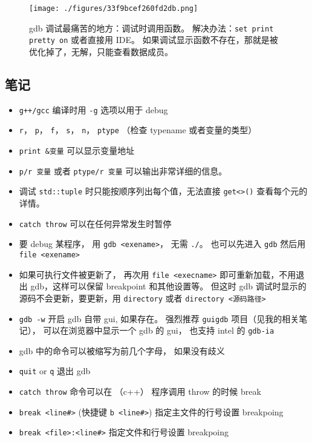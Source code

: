 

\begin{figure}[ht]
\centering
\texttt{[image: ./figures/33f9bcef260fd2db.png]}
\caption{gdb 调试最痛苦的地方：调试时调用函数。 解决办法：\verb`set print pretty on` 或者直接用 IDE。 如果调试显示函数不存在，那就是被优化掉了，无解，只能查看数据成员。} \label{fig_gdbNt_1}
\end{figure}

\subsection{笔记}
\begin{itemize}
\item \verb`g++/gcc` 编译时用 \verb`-g` 选项以用于 debug
\item \verb`r`， \verb`p`， \verb`f`， \verb`s`， \verb`n`， \verb`ptype` （检查 typename 或者变量的类型）
\item \verb`print &变量` 可以显示变量地址
\item \verb`p/r 变量` 或者 \verb`ptype/r 变量` 可以输出非常详细的信息。
\item 调试 \verb`std::tuple` 时只能按顺序列出每个值，无法直接 \verb`get<>()` 查看每个元的详情。
\item \verb`catch throw` 可以在任何异常发生时暂停
\item 要 debug 某程序， 用 \verb`gdb <exename>`， 无需 \verb`./`。 也可以先进入 \verb`gdb` 然后用 \verb`file <exename>`
\item 如果可执行文件被更新了， 再次用 \verb`file <execname>` 即可重新加载，不用退出 gdb，这样可以保留 breakpoint 和其他设置等。 但这时 gdb 调试时显示的源码不会更新，要更新，用 \verb`directory` 或者 \verb`directory <源码路径>`
\item \verb`gdb -w` 开启 gdb 自带 gui, 如果存在。 强烈推荐 \verb`guigdb` 项目（见我的相关笔记）， 可以在浏览器中显示一个 gdb 的 gui， 也支持 intel 的 \verb`gdb-ia`
\item gdb 中的命令可以被缩写为前几个字母， 如果没有歧义
\item \verb`quit` or \verb`q` 退出 gdb
\item \verb`catch throw` 命令可以在 （c++） 程序调用 throw 的时候 break
\item \verb`break <line#>`  (快捷键 \verb`b <line#>`) 指定主文件的行号设置 breakpoing
\item \verb`break <file>:<line#>` 指定文件和行号设置 breakpoing

\end{itemize}
